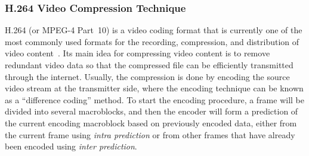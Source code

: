 \subsubsection{H.264 Video Compression Technique}
\label{sec::H264CompressionIntro}
%
H.264 (or MPEG-4 Part~10) is a video coding format that is currently one of the most commonly used formats for the recording, compression, and distribution of video content~\cite{H264Book}.
Its main idea for compressing video content is to remove redundant video data so that the compressed file can be efficiently transmitted through the internet.
Usually, the compression is done by encoding the source video stream at the transmitter side, where the encoding technique can be known as a ``difference coding'' method.
To start the encoding procedure, a frame will be divided into several macroblocks, and then the encoder will form a prediction of the current encoding macroblock based on previously encoded data, either from the current frame using \emph{intra prediction} or from other frames that have already been encoded using \emph{inter prediction}.

